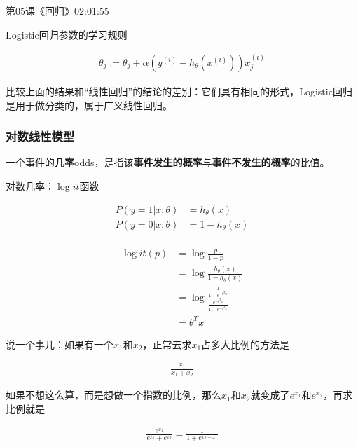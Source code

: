 \documentclass[UTF8]{ctexart}
\begin{document}
第05课《回归》02:01:55

Logistic回归参数的学习规则

\begin{equation}
\begin{aligned}
\theta_{j} := \theta_{j} + \alpha (y^{(i)}-h_{\theta}(x^{(i)}))x^{(i)}_{j}
\end{aligned}
\end{equation}

比较上面的结果和“线性回归”的结论的差别：它们具有相同的形式，Logistic回归是用于做分类的，属于广义线性回归。

\subsubsection{对数线性模型}

一个事件的\textbf{几率}odds，是指该\textbf{事件发生的概率}与\textbf{事件不发生的概率}的比值。

对数几率：$\log it$函数

 \begin{equation}
\begin{aligned}
P(y=1|x;\theta)&=h_{\theta}(x)\\
P(y=0|x;\theta)&=1-h_{\theta}(x)\\
\end{aligned}
\end{equation}

\begin{equation}
\begin{aligned}
\log it(p) &= \log \frac{p}{1-p}\\
&= \log \frac{h_{\theta}(x)}{1-h_{\theta}(x)}\\
&=\log \frac{\frac{1}{1+e^{-\theta^{T}x}}}{\frac{e^{-\theta^{T}x}}{1+e^{-\theta^{T}x}}}\\
&= \theta^{T}x
\end{aligned}
\end{equation}

说一个事儿：如果有一个$x_{1}$和$x_{2}$，正常去求$x_{1}$占多大比例的方法是

\begin{equation}
\begin{aligned}
\frac{x_{1}}{x_{1}+x_{2}}
\end{aligned}
\end{equation}

如果不想这么算，而是想做一个指数的比例，那么$x_{1}$和$x_{2}$就变成了$e^{x_{1}}$和$e^{x_{2}}$，再求比例就是

\begin{equation}
\begin{aligned}
\frac{e^{x_{1}}}{e^{x_{1}}+e^{x_{2}}} = \frac{1}{1+e^{x_{2}-x_{1}}}
\end{aligned}
\end{equation}
\end{document}
